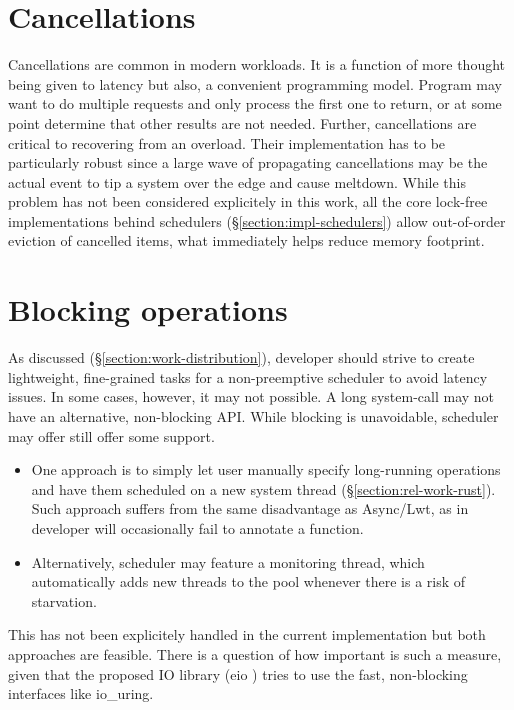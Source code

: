 \documentclass[12pt,a4paper,twoside]{report}
\begin{document}
\section{Cancellations}
\label{section:cancellations}
Cancellations are common in modern workloads. It is a function of more thought being given to latency but also, a convenient programming model. Program may want to do multiple requests and only process the first one to return, or at some point determine that other results are not needed. Further, cancellations are critical to recovering from an overload. Their implementation has to be particularly robust since a large wave of propagating cancellations may be the actual event to tip a system over the edge and cause meltdown. While this problem has not been considered explicitely in this work, all the core lock-free implementations behind schedulers (\S\ref{section:impl-schedulers}) allow out-of-order eviction of cancelled items, what immediately helps reduce memory footprint.


\section{Blocking operations}
As discussed (\S\ref{section:work-distribution}), developer should strive to create lightweight, fine-grained tasks for a non-preemptive scheduler to avoid latency issues. In some cases, however, it may not possible. A long system-call may not have an alternative, non-blocking API. While blocking is unavoidable, scheduler may offer still offer some support.
\begin{itemize}
    \item One approach is to simply let user manually specify long-running operations and have them scheduled on a new system thread (\S\ref{section:rel-work-rust}). Such approach suffers from the same disadvantage as Async/Lwt, as in developer will occasionally fail to annotate a function.
    \item Alternatively, scheduler may feature a monitoring thread, which automatically adds new threads to the pool whenever there is a risk of starvation.  
\end{itemize}


This has not been explicitely handled in the current implementation but both approaches are feasible. There is a question of how important is such a measure, given that the proposed IO library (eio \cite{ocamlmul5:online}) tries to use the fast, non-blocking interfaces like io\_uring.
\end{document}
